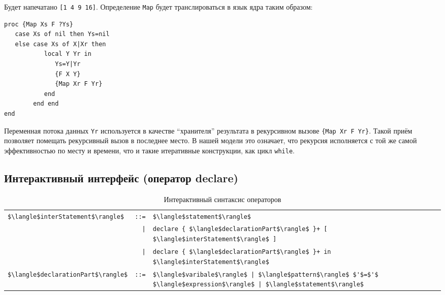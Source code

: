 Будет напечатано \lstinline|[1 4 9 16]|. Определение \lstinline|Map| будет транслироваться в язык ядра таким образом:

\begin{lstlisting}[mathescape=false]
proc {Map Xs F ?Ys}
   case Xs of nil then Ys=nil
   else case Xs of X|Xr then
           local Y Yr in
              Ys=Y|Yr
              {F X Y}
              {Map Xr F Yr}
           end
        end end
end
\end{lstlisting}

Переменная потока данных \lstinline|Yr| используется в качестве ``хранителя'' результата в рекурсивном вызове \lstinline|{Map Xr F Yr}|. Такой приём позволяет помещать рекурсивный вызов в последнее место. В нашей модели это означает, что рекурсия исполняется с той же самой эффективностью по месту и времени, что и такие итеративные конструкции, как цикл \lstinline|while|.


\subsection{Интерактивный интерфейс (оператор declare)}

\begin{table}
  \begin{tabular}{|lrl|}
    \hline
    \lstinline|$\langle$interStatement$\rangle$| & \lstinline|::=| & \lstinline|$\langle$statement$\rangle$|\\
    & \lstinline!|!& \lstinline|declare { $\langle$declarationPart$\rangle$ }+ [ $\langle$interStatement$\rangle$ ]|\\
    & \lstinline!|!& \lstinline|declare { $\langle$declarationPart$\rangle$ }+ in $\langle$interStatement$\rangle$|\\
    \lstinline|$\langle$declarationPart$\rangle$| & \lstinline|::=| & \lstinline!$\langle$varibale$\rangle$ | $\langle$pattern$\rangle$ $'$=$'$ $\langle$expression$\rangle$ | $\langle$statement$\rangle$!\\
    \hline
  \end{tabular}
\caption{Интерактивный синтаксис операторов}
\label{table:interactive_statement_syntax}
\end{table}

